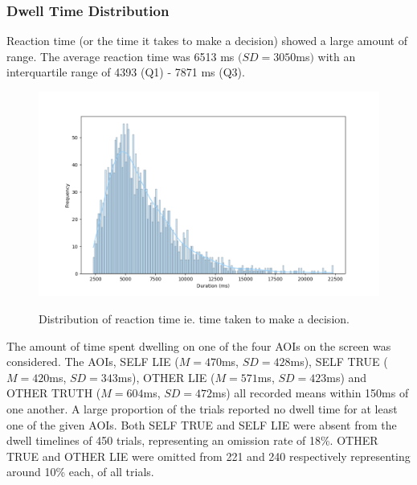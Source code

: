 \documentclass[man, floatsintext]{apa7}
\begin{document}
\subsubsection{Dwell Time Distribution}

Reaction time (or the time it takes to make a decision) showed a large amount of range. The average reaction time was 6513 ms $(SD = 3050$ms$)$ with an interquartile range of 4393 (Q1) - 7871 ms (Q3).

\begin{figure}[H]
	\centering
	\includegraphics[width=0.75\linewidth]{../plots/Dwell/RTDistPlot.png}
	\label{fig:RTDistPlot}
	\caption{Distribution of reaction time ie. time taken to make a decision.}
\end{figure}

The amount of time spent dwelling on one of the four AOIs on the screen was considered. The AOIs, SELF LIE ($M = 470$ms, $SD = 428$ms), SELF TRUE ($M = 420$ms, $SD = 343$ms), OTHER LIE ($M = 571$ms, $SD = 423$ms) and OTHER TRUTH ($M = 604$ms, $SD = 472$ms) all recorded means within 150ms of one another. A large proportion of the trials reported no dwell time for at least one of the given AOIs. Both SELF TRUE and SELF LIE were absent from the dwell timelines of 450 trials, representing an omission rate of 18\%. OTHER TRUE and OTHER LIE were omitted from 221 and 240 respectively representing around 10\% each, of all trials.
\end{document}

